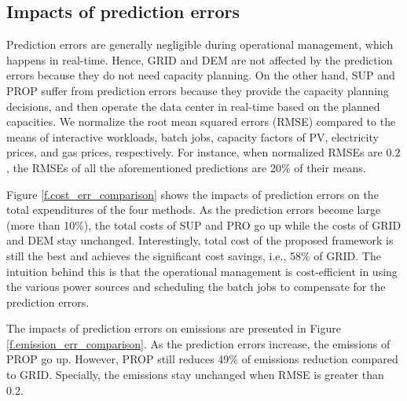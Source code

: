 \subsection{Impacts of prediction errors}
\label{sec:ImpactOfPredictionErrors}


Prediction errors are generally negligible during operational management, which happens in real-time. Hence, GRID and DEM are not affected by the prediction errors because they do not need capacity planning. On the other hand, SUP and PROP suffer from prediction errors because they provide the capacity planning decisions, and then operate the data center in real-time based on the planned capacities. We normalize the root mean squared errors (RMSE) compared to the means of interactive workloads, batch jobs, capacity factors of PV, electricity prices, and gas prices, respectively. For instance, when normalized RMSEs are $0.2$, the RMSEs of all the aforementioned predictions are 20\% of their means. 

Figure {\ref{f.cost_err_comparison}} shows the impacts of prediction errors on the total expenditures of the four methods. As the prediction errors become large (more than 10\%), the total costs of SUP and PRO go up while the costs of GRID and DEM stay unchanged. Interestingly, total cost of the proposed framework is still the best and achieves the significant cost savings, i.e., 58\% of GRID. The intuition behind this is that the operational management is cost-efficient in using the various power sources and scheduling the batch jobs to compensate for the prediction errors.

The impacts of prediction errors on emissions are presented in Figure {\ref{f.emission_err_comparison}}. As the prediction errors increase, the emissions of PROP go up. However, PROP still reduces 49\% of emissions reduction compared to GRID. Specially, the emissions stay unchanged when RMSE is greater than 0.2.

